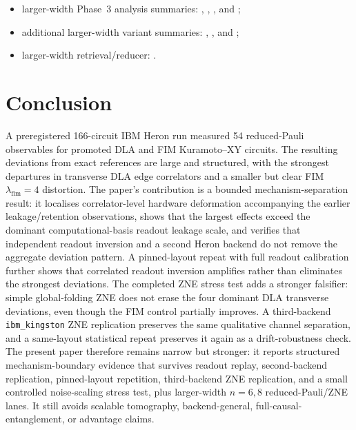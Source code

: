 \documentclass[preprint,aps,physrev,superscriptaddress,floatfix,longbibliography]{revtex4-2}
\begin{document}
\begin{itemize}
    ;
  \item larger-width Phase~3 analysis summaries:
    ,
    ,
    , and
    ;
  \item additional larger-width variant summaries:
    ,
    , and
    ;
  \item larger-width retrieval/reducer:
    .
\end{itemize}

\section{Conclusion}

A preregistered 166-circuit IBM Heron run measured 54 reduced-Pauli observables
for promoted DLA and FIM Kuramoto--XY circuits. The resulting deviations from
exact references are large and structured, with the strongest departures in
transverse DLA edge correlators and a smaller but clear FIM
$\lambda_{\mathrm{fim}}=4$ distortion. The paper's contribution is a bounded
mechanism-separation result: it localises correlator-level hardware
deformation accompanying the earlier leakage/retention observations, shows
that the largest effects exceed the dominant computational-basis readout
leakage scale, and verifies that independent readout inversion and a second
Heron backend do not remove the aggregate deviation pattern. A pinned-layout
repeat with full readout calibration further shows that correlated readout
inversion amplifies rather than eliminates the strongest deviations. The
completed ZNE stress test adds a stronger falsifier: simple global-folding ZNE
does not erase the four dominant DLA transverse deviations, even though the FIM
control partially improves. A third-backend \texttt{ibm\_kingston} ZNE
replication preserves the same qualitative channel separation, and a
same-layout statistical repeat preserves it again as a drift-robustness check.
The present paper therefore remains narrow but stronger: it reports structured
mechanism-boundary evidence that survives readout replay, second-backend
replication, pinned-layout repetition, third-backend ZNE replication, and a
small controlled noise-scaling stress test, plus larger-width $n=6,8$
reduced-Pauli/ZNE lanes. It still avoids scalable
tomography, backend-general, full-causal-entanglement, or advantage claims.



\end{document}
